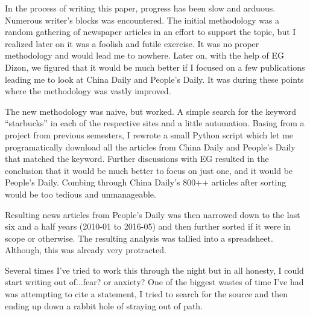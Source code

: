 \documentclass[12pt]{article}
\begin{document}
	\onehalfspacing
	In the process of writing this paper, progress has been slow and
	arduous. Numerous writer's blocks was encountered. The initial
	methodology was a random gathering of newspaper articles in an effort to
	support the topic, but I realized later on it was a foolish and futile
	exercise. It was no proper methodology and would lead me to nowhere.
	Later on, with the help of EG Dizon, we figured that it would be much
	better if I focused on a few publications leading me to look at China
	Daily and People's Daily. It was during these points where the
	methodology was vastly improved.

	The new methodology was naive, but worked. A simple search for the
	keyword ``starbucks'' in each of the respective sites and a little
	automation.  Basing from a project from previous semesters, I rewrote a
	small Python script which let me programatically download all the
	articles from China Daily and People's Daily that matched the keyword.
	Further discussions with EG resulted in the conclusion that it would be
	much better to focus on just one, and it would be People's Daily.
	Combing through China Daily's 800++ articles after sorting would be too
	tedious and unmanageable.

	Resulting news articles from People's Daily was then narrowed down to
	the last six and a half years (2010-01 to 2016-05) and then further
	sorted if it were in scope or otherwise. The resulting analysis was
	tallied into a spreadsheet. Although, this was already very protracted.

	Several times I've tried to work this through the night but in all
	honesty, I could start writing out of...fear? or anxiety? One of the
	biggest wastes of time I've had was attempting to cite a statement, I
	tried to search for the source and then ending up down a rabbit hole of
	straying out of path.
\end{document}
